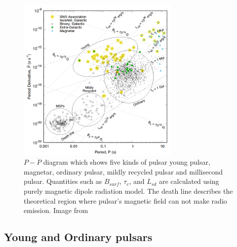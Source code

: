 \documentclass[thesis_msc.tex]{subfiles}
\begin{document}
        \begin{figure}[h] \centering \includegraphics[width=0.7\textwidth]{figures/P-pdot.png}
\caption{ $P- \dot{P}$ diagram which shows five kinds of pulsar young pulsar, magnetar,  ordinary pulsar, mildly recycled pulsar and millisecond pulsar. Quantities such as $B_{surf}$, $\tau_c$, and $L_{sd}$ are calculated using purely magnetic dipole radiation model.  The death line describes the theoretical region where pulsar's magnetic field can not make radio emission. Image from ~\cite{Alex}}
\label{ppdot}
\end{figure}

\subsection{Young and Ordinary pulsars}
\end{document}
